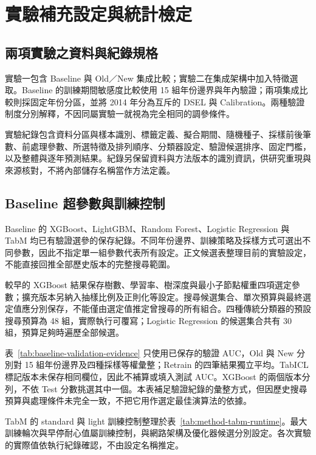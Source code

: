 \chapter{實驗補充設定與統計檢定}\label{app:experimental-details}
\begingroup
\setlength{\emergencystretch}{2em}

\section{兩項實驗之資料與紀錄規格}

實驗一包含 Baseline 與 Old／New 集成比較；實驗二在集成架構中加入特徵選取。Baseline 的訓練期間敏感度比較使用 15 組年份邊界與年內驗證；兩項集成比較則採固定年份分區，並將 2014 年分為互斥的 DSEL 與 Calibration。兩種驗證制度分別解釋，不因同屬實驗一就視為完全相同的調參條件。

實驗紀錄包含資料分區與樣本識別、標籤定義、擬合期間、隨機種子、採樣前後筆數、前處理參數、所選特徵及排列順序、分類器設定、驗證候選排序、固定門檻，以及整體與逐年預測結果。紀錄另保留資料與方法版本的識別資訊，供研究重現與來源核對，不將內部儲存名稱當作方法定義。

\section{Baseline 超參數與訓練控制}

Baseline 的 XGBoost、LightGBM、Random Forest、Logistic Regression 與 TabM 均已有驗證選參的保存紀錄。不同年份邊界、訓練策略及採樣方式可選出不同參數，因此不指定單一組參數代表所有設定。正文候選表整理目前的實驗設定，不能直接回推全部歷史版本的完整搜尋範圍。

較早的 XGBoost 結果保存樹數、學習率、樹深度與最小子節點權重四項選定參數；擴充版本另納入抽樣比例及正則化等設定。搜尋候選集合、單次預算與最終選定值應分別保存，不能僅由選定值推定曾搜尋的所有組合。四種傳統分類器的預設搜尋預算為 48 組，實際執行可覆寫；Logistic Regression 的候選集合共有 30 組，預算足夠時遍歷全部候選。

\clearpage


表~\ref{tab:baseline-validation-evidence} 只使用已保存的驗證 AUC，Old 與 New 分別對 15 組年份邊界及四種採樣等權彙整；Retrain 的四筆結果獨立平均。TabICL 標記版本未保存相同欄位，因此不補算或填入測試 AUC。XGBoost 的兩個版本分列，不依 Test 分數挑選其中一個。本表補足驗證紀錄的彙整方式，但因歷史搜尋預算與處理條件未完全一致，不把它用作選定最佳演算法的依據。

TabM 的 standard 與 light 訓練控制整理於表~\ref{tab:method-tabm-runtime}。最大訓練輪次與早停耐心值屬訓練控制，與網路架構及優化器候選分別設定。各次實驗的實際值依執行紀錄確認，不由設定名稱推定。

